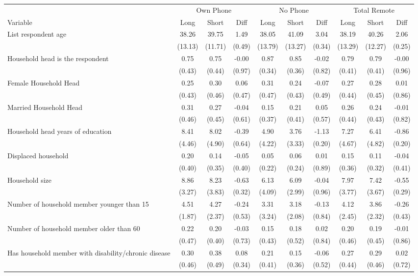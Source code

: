 \begin{tabular}{l*{9}c}
\hline\hline
 & \multicolumn{3}{c}{Own Phone} & \multicolumn{3}{c}{No Phone} & \multicolumn{3}{c}{Total Remote}\\ 
Variable & Long & Short & Diff & Long & Short & Diff & Long & Short & Diff \\
\hline
List respondent age&38.26&39.75&1.49&38.05&41.09&3.04&38.19&40.26&2.06\\
&(13.13)&(11.71)&(0.49)&(13.79)&(13.27)&(0.34)&(13.29)&(12.27)&(0.25)\\
Household head is the respondent&0.75&0.75&-0.00&0.87&0.85&-0.02&0.79&0.79&-0.00\\
&(0.43)&(0.44)&(0.97)&(0.34)&(0.36)&(0.82)&(0.41)&(0.41)&(0.96)\\
Female Household Head&0.25&0.30&0.06&0.31&0.24&-0.07&0.27&0.28&0.01\\
&(0.43)&(0.46)&(0.47)&(0.47)&(0.43)&(0.49)&(0.44)&(0.45)&(0.86)\\
Married Household Head&0.31&0.27&-0.04&0.15&0.21&0.05&0.26&0.24&-0.01\\
&(0.46)&(0.45)&(0.61)&(0.37)&(0.41)&(0.57)&(0.44)&(0.43)&(0.82)\\
Household head years of education&8.41&8.02&-0.39&4.90&3.76&-1.13&7.27&6.41&-0.86\\
&(4.46)&(4.90)&(0.64)&(4.22)&(3.33)&(0.20)&(4.67)&(4.82)&(0.20)\\
Displaced household&0.20&0.14&-0.05&0.05&0.06&0.01&0.15&0.11&-0.04\\
&(0.40)&(0.35)&(0.40)&(0.22)&(0.24)&(0.89)&(0.36)&(0.32)&(0.41)\\
Household size&8.86&8.23&-0.63&6.13&6.09&-0.04&7.97&7.42&-0.55\\
&(3.27)&(3.83)&(0.32)&(4.09)&(2.99)&(0.96)&(3.77)&(3.67)&(0.29)\\
Number of household member younger than 15&4.51&4.27&-0.24&3.31&3.18&-0.13&4.12&3.86&-0.26\\
&(1.87)&(2.37)&(0.53)&(3.24)&(2.08)&(0.84)&(2.45)&(2.32)&(0.43)\\
Number of household member older than 60&0.22&0.20&-0.03&0.15&0.18&0.02&0.20&0.19&-0.01\\
&(0.47)&(0.40)&(0.73)&(0.43)&(0.52)&(0.84)&(0.46)&(0.45)&(0.86)\\
Has household member with disability/chronic disease&0.30&0.38&0.08&0.21&0.15&-0.06&0.27&0.29&0.02\\
&(0.46)&(0.49)&(0.34)&(0.41)&(0.36)&(0.52)&(0.44)&(0.46)&(0.72)\\

\end{tabular}
